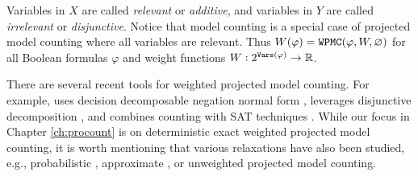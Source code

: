 Variables in $X$ are called \emph{relevant} or \emph{additive}, and variables in $Y$ are called \emph{irrelevant} or \emph{disjunctive}. 
Notice that model counting is a special case of projected model counting where all variables are relevant. Thus $W(\varphi) = \texttt{\upshape WPMC}(\varphi, W, \varnothing)$ for all Boolean formulas $\varphi$ and weight functions $W: 2^{\texttt{\upshape Vars}(\varphi)} \rightarrow \mathbb{R}$. 

There are several recent tools for weighted projected model counting.
For example, \dfp{} uses decision decomposable negation normal form \cite{lagniez2019recursive}, \projmc{} leverages disjunctive decomposition \cite{lagniez2019recursive}, and \ssat{} combines counting with SAT techniques \cite{lee2017solving}. 
While our focus in Chapter \ref{ch:procount} is on deterministic exact weighted projected model counting, it is worth mentioning that various relaxations have also been studied, e.g., probabilistic \cite{sharma2019ganak}, approximate \cite{ermon2013taming,fremont2017maximum,soos2019bird}, or unweighted \cite{zawadzki2013generalization,aziz2015projected,mohle2018dualizing,hecher2020taming} projected model counting.
